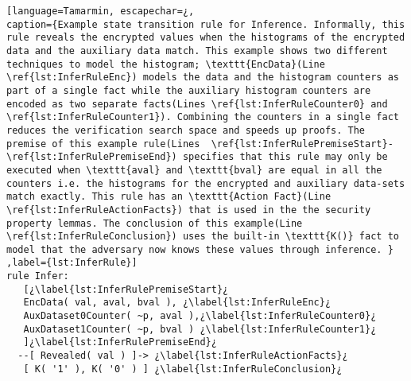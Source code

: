 \begin{lstlisting}[language=Tamarmin, escapechar=¿, 
caption={Example state transition rule for Inference. Informally, this rule reveals the encrypted values when the histograms of the encrypted data and the auxiliary data match. This example shows two different techniques to model the histogram; \texttt{EncData}(Line \ref{lst:InferRuleEnc}) models the data and the histogram counters as part of a single fact while the auxiliary histogram counters are encoded as two separate facts(Lines \ref{lst:InferRuleCounter0} and \ref{lst:InferRuleCounter1}). Combining the counters in a single fact reduces the verification search space and speeds up proofs. The premise of this example rule(Lines  \ref{lst:InferRulePremiseStart}-\ref{lst:InferRulePremiseEnd}) specifies that this rule may only be executed when \texttt{aval} and \texttt{bval} are equal in all the counters i.e. the histograms for the encrypted and auxiliary data-sets match exactly. This rule has an \texttt{Action Fact}(Line \ref{lst:InferRuleActionFacts}) that is used in the the security property lemmas. The conclusion of this example(Line \ref{lst:InferRuleConclusion}) uses the built-in \texttt{K()} fact to model that the adversary now knows these values through inference. } ,label={lst:InferRule}]
rule Infer:
   [¿\label{lst:InferRulePremiseStart}¿
   EncData( val, aval, bval ), ¿\label{lst:InferRuleEnc}¿
   AuxDataset0Counter( ~p, aval ),¿\label{lst:InferRuleCounter0}¿
   AuxDataset1Counter( ~p, bval ) ¿\label{lst:InferRuleCounter1}¿
   ]¿\label{lst:InferRulePremiseEnd}¿ 
  --[ Revealed( val ) ]-> ¿\label{lst:InferRuleActionFacts}¿
   [ K( '1' ), K( '0' ) ] ¿\label{lst:InferRuleConclusion}¿

\end{lstlisting}
